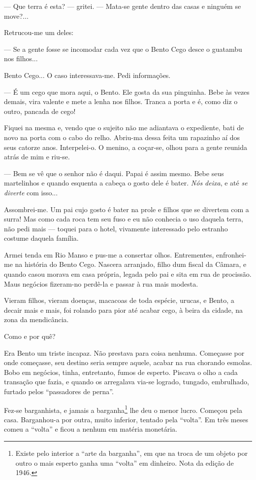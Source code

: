 --- Que terra é esta? --- gritei. --- Mata-se gente dentro das casas e
ninguém se move?...

Retrucou-me um deles:

--- Se a gente fosse se incomodar cada vez que o Bento Cego desce o
guatambu nos filhos...

Bento Cego... O caso interessava-me. Pedi informações.

--- É um cego que mora aqui, o Bento. Ele gosta da sua pinguinha. Bebe
às vezes demais, vira valente e mete a lenha nos filhos. Tranca a porta
e é, como diz o outro, pancada de cego!

Fiquei na mesma e, vendo que o sujeito não me adiantava o expediente,
bati de novo na porta com o cabo do relho. Abriu-ma dessa feita um
rapazinho aí dos seus catorze anos. Interpelei-o. O menino, a coçar-se,
olhou para a gente reunida atrás de mim e riu-se.

--- Bem se vê que o senhor não é daqui. Papai é assim mesmo. Bebe seus
martelinhos e quando esquenta a cabeça o gosto dele é bater. \emph{Nós
deixa}, e até \emph{se diverte} com isso...

Assombrei-me. Um pai cujo gosto é bater na prole e filhos que se
divertem com a surra! Mas como cada roca tem seu fuso e eu não conhecia
o uso daquela terra, não pedi mais --- toquei para o hotel, vivamente
interessado pelo estranho costume daquela família.

Armei tenda em Rio Manso e pus-me a consertar olhos. Entrementes,
enfronhei-me na história do Bento Cego. Nascera arranjado, filho dum
fiscal da Câmara, e quando casou morava em casa própria, legada pelo pai
e sita em rua de procissão. Maus negócios fizeram-no perdê-la e passar à
rua mais modesta.

Vieram filhos, vieram doenças, macacoas de toda espécie, urucas, e
Bento, a decair mais e mais, foi rolando para pior até acabar cego, à
beira da cidade, na zona da mendicância.

Como e por quê?

Era Bento um triste incapaz. Não prestava para coisa nenhuma. Começasse
por onde começasse, seu destino seria sempre aquele, acabar na rua
chorando esmolas. Bobo em negócios, tinha, entretanto, fumos de esperto.
Piscava o olho a cada transação que fazia, e quando os arregalava via-se
logrado, tungado, embrulhado, furtado pelos ``passadores de perna''.

Fez-se barganhista, e jamais a barganha\footnote{Existe pelo interior a
  ``arte da barganha'', em que na troca de um objeto por outro o mais
  esperto ganha uma ``volta'' em dinheiro. Nota da edição de 1946.} lhe
deu o menor lucro. Começou pela casa. Barganhou-a por outra, muito
inferior, tentado pela ``volta''. Em três meses comeu a ``volta'' e
ficou a nenhum em matéria monetária.


